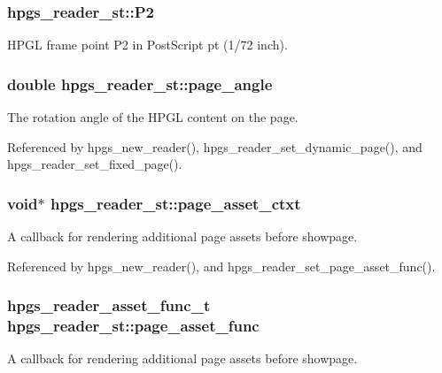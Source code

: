 \subsubsection[{P2}]{ {\bf hpgs\_\-reader\_\-st::P2}}\label{structhpgs__reader__st_a202ca8d57bb648548e2d7734271cc055}
HPGL frame point P2 in PostScript pt (1/72 inch). 
\subsubsection[{page\_\-angle}]{\setlength{\rightskip}{0pt plus 5cm}double {\bf hpgs\_\-reader\_\-st::page\_\-angle}}\label{structhpgs__reader__st_a7b872779669ce0f0f8808383899ee0ea}
The rotation angle of the HPGL content on the page. 

Referenced by hpgs\_\-new\_\-reader(), hpgs\_\-reader\_\-set\_\-dynamic\_\-page(), and hpgs\_\-reader\_\-set\_\-fixed\_\-page().

\subsubsection[{page\_\-asset\_\-ctxt}]{\setlength{\rightskip}{0pt plus 5cm}void$\ast$ {\bf hpgs\_\-reader\_\-st::page\_\-asset\_\-ctxt}}\label{structhpgs__reader__st_a51299fdec828aae63911855615d3abf6}
A callback for rendering additional page assets before showpage. 

Referenced by hpgs\_\-new\_\-reader(), and hpgs\_\-reader\_\-set\_\-page\_\-asset\_\-func().

\subsubsection[{page\_\-asset\_\-func}]{\setlength{\rightskip}{0pt plus 5cm}hpgs\_\-reader\_\-asset\_\-func\_\-t {\bf hpgs\_\-reader\_\-st::page\_\-asset\_\-func}}\label{structhpgs__reader__st_a489a8be5a1404f6442db2bcb979f8e04}
A callback for rendering additional page assets before showpage. 

